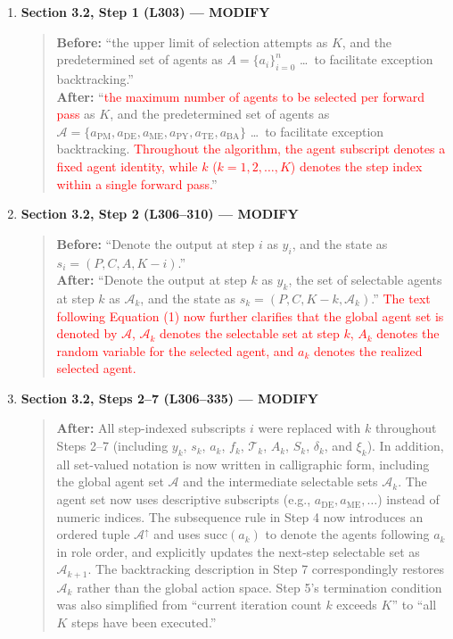 \documentclass[11pt,a4paper]{article}
\begin{document}
\begin{enumerate}
\item \textbf{Section 3.2, Step 1 (L303) --- MODIFY}
\begin{quote}
\textbf{Before:} ``the upper limit of selection attempts as $K$, and the predetermined set of agents as $A=\{a_i\}_{i=0}^n$ \ldots\ to facilitate exception backtracking.''\\[4pt]
\textbf{After:} ``\textcolor{red}{the maximum number of agents to be selected per forward pass} as $K$, and the predetermined set of agents as $\mathcal{A}=\{a_{\text{PM}}, a_{\text{DE}}, a_{\text{ME}}, a_{\text{PY}}, a_{\text{TE}}, a_{\text{BA}}\}$ \ldots\ to facilitate exception backtracking. \textcolor{red}{Throughout the algorithm, the agent subscript denotes a fixed agent identity, while $k$ ($k = 1, 2, \ldots, K$) denotes the step index within a single forward pass.}''
\end{quote}

\item \textbf{Section 3.2, Step 2 (L306--310) --- MODIFY}
\begin{quote}
\textbf{Before:} ``Denote the output at step $i$ as $y_i$, and the state as $s_i=(P,C,A,K-i)$.''\\[4pt]
\textbf{After:} ``Denote the output at step $k$ as $y_k$, the set of selectable agents at step $k$ as $\mathcal{A}_k$, and the state as $s_k=(P, C, K-k, \mathcal{A}_k)$.'' \textcolor{red}{The text following Equation (1) now further clarifies that the global agent set is denoted by $\mathcal{A}$, $\mathcal{A}_k$ denotes the selectable set at step $k$, $A_k$ denotes the random variable for the selected agent, and $a_k$ denotes the realized selected agent.}
\end{quote}

\item \textbf{Section 3.2, Steps 2--7 (L306--335) --- MODIFY}
\begin{quote}
\textbf{After:} All step-indexed subscripts $i$ were replaced with $k$ throughout Steps 2--7 (including $y_k$, $s_k$, $a_k$, $f_k$, $\mathcal{T}_k$, $A_k$, $S_k$, $\delta_k$, and $\xi_k$). In addition, all set-valued notation is now written in calligraphic form, including the global agent set $\mathcal{A}$ and the intermediate selectable sets $\mathcal{A}_k$. The agent set now uses descriptive subscripts (e.g., $a_{\text{DE}}, a_{\text{ME}}, \ldots$) instead of numeric indices. The subsequence rule in Step 4 now introduces an ordered tuple $\mathcal{A}^{\uparrow}$ and uses $\mathrm{succ}(a_k)$ to denote the agents following $a_k$ in role order, and explicitly updates the next-step selectable set as $\mathcal{A}_{k+1}$. The backtracking description in Step 7 correspondingly restores $\mathcal{A}_k$ rather than the global action space. Step 5's termination condition was also simplified from ``current iteration count $k$ exceeds $K$'' to ``all $K$ steps have been executed.''
\end{quote}


\end{enumerate}
\end{document}
